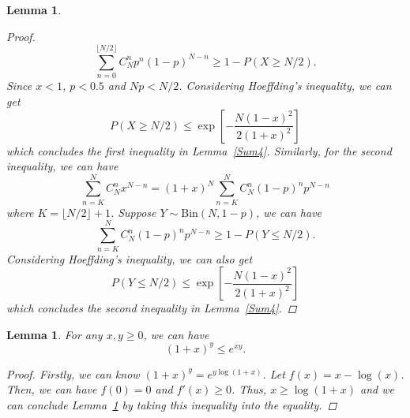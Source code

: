 \documentclass{article}
\newtheorem{lemma}[theorem]{Lemma}
\begin{document}
\begin{lemma}
\begin{proof}
\begin{equation}
\sum_{n=0}^{\lfloor N/2\rfloor} C_N^{n} p^n (1-p)^{N-n}\geq 1-P\left(X\geq N/2\right).
\end{equation}
Since $x<1$, $p<0.5$ and $Np<N/2$. Considering Hoeffding's inequality, we can get
\begin{equation}
P\left(X\geq N/2\right)\leq \exp \left[-\frac{N(1-x)^2}{2(1+x)^2}\right]
\end{equation}
which concludes the first inequality in Lemma~\ref{Sum4}. Similarly, for the second inequality, we can have
\begin{equation}
\sum_{n=K}^{N} C_N^{n}x^{N-n}=(1+x)^{N}\sum_{n=K}^{N} C_N^{n} (1-p)^n p^{N-n}
\end{equation}
where $K=\lfloor N/2 \rfloor +1$. Suppose $Y\sim \mathrm{Bin}(N, 1-p)$, we can have
\begin{equation}
\sum_{n=K}^{N} C_N^{n} (1-p)^n p^{N-n}\geq 1-P\left(Y\leq N/2\right).
\end{equation}
Considering Hoeffding's inequality, we can also get
\begin{equation}
P\left(Y\leq N/2\right)\leq \exp \left[-\frac{N(1-x)^2}{2(1+x)^2}\right]
\end{equation}
which concludes the second inequality in Lemma~\ref{Sum4}.
\end{proof}
\end{lemma}

\begin{lemma}
\label{Inequality1}
For any $x,y\geq 0$, we can have
$$(1+x)^{y}\leq e^{xy}.$$
\begin{proof}
Firstly, we can know $(1+x)^{y}=e^{y\log(1+x)}$. Let $f(x)=x-\log(x)$. Then, we can have $f(0)=0$ and $f'(x)\geq 0$. Thus, $x\geq\log (1+x)$ and we can conclude Lemma~\ref{Inequality1} by taking this inequality into the equality.
\end{proof}
\end{lemma}


\end{document}
